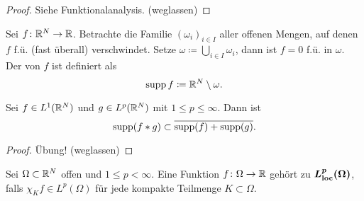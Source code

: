 \begin{proof}
	Siehe Funktionalanalysis. (weglassen)
\end{proof}
\begin{definition}
	Sei \(f\colon\mathbb{R}^N \to \mathbb{R}\). Betrachte die Familie \((\omega_i)_{i\in I}\) aller offenen Mengen, auf denen \(f\) f.ü. (fast überall) verschwindet. Setze \(\omega\coloneqq\bigcup_{i\in I}\omega_i\), dann ist \(f=0\) f.ü. in \(\omega\). Der  von \(f\) ist definiert als
	\begin{equation*}
		\operatorname{supp} f\coloneqq\mathbb{R}^N\setminus\omega.
	\end{equation*}
\end{definition}
\begin{lem}\label{lem: supp(f*g) subset suppf + supp g}
	Sei \(f\in L^1(\mathbb{R}^N)\) und \(g\in L^p(\mathbb{R}^N)\) mit \(1\leq p\leq\infty\). Dann ist
	\begin{equation*}
		\operatorname{supp}(f\ast g)\subset\overline{\operatorname{supp}(f)+\operatorname{supp}(g)}.
	\end{equation*}
\end{lem}
\begin{proof}
	Übung! (weglassen)
\end{proof}
\begin{definition}
	Sei \(\Omega\subset\mathbb{R}^N\) offen und \(1\leq p<\infty\). Eine Funktion \(f\colon\Omega \to \mathbb{R}\) gehört zu \(\bm{L_{\mathrm{loc}}^p(\Omega)}\), falls \(\chi_Kf\in L^p(\Omega)\) für jede kompakte Teilmenge \(K\subset\Omega\).
\end{definition}
